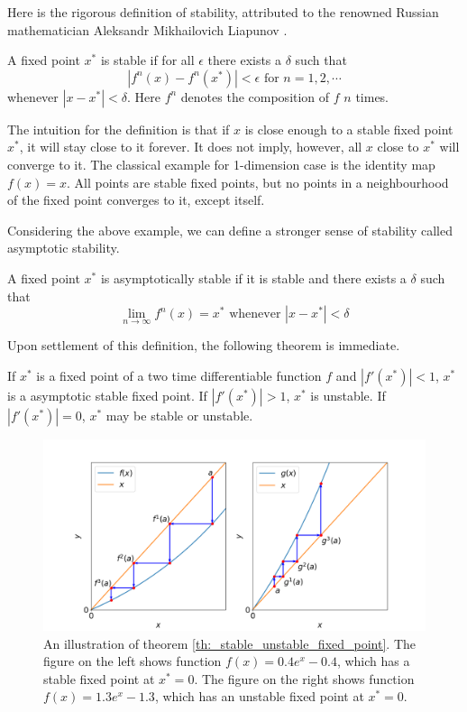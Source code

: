 Here is the rigorous definition of stability, attributed to the renowned Russian mathematician Aleksandr Mikhailovich Liapunov \cite{lyapunov}.

\begin{defn}
A fixed point $x^*$ is stable if for all $\epsilon$ there exists a $\delta$ such that 
$$
	|f^n(x) - f^n(x^*)| < \epsilon \text{ for } n = 1,2, \cdots 
$$
whenever $|x - x^*| < \delta$.
Here $f^n$ denotes the composition of $f$ $n$ times.
\end{defn}

The intuition for the definition is that if $x$ is close enough to a stable fixed point $x^*$, it will stay close to it forever. 
It does not imply, however, all $x$ close to $x^*$ will converge to it.
The classical example for 1-dimension case is the identity map $f(x) = x$. 
All points are stable fixed points, but no points in a neighbourhood of the fixed point converges to it, except itself.

Considering the above example, we can define a stronger sense of stability called asymptotic stability.

\begin{defn}
	A fixed point $x^*$ is asymptotically stable if it is stable and there exists a $\delta$ such that 
	$$
		\lim_{n \rightarrow \infty} f^n(x) = x^* \text{ whenever } |x - x^*| < \delta
	$$
\end{defn}

Upon settlement of this definition, the following theorem is immediate.

\begin{thm}\label{th:_stable_unstable_fixed_point}
	If $x^*$ is a fixed point of a two time differentiable function $f$ and $|f'(x^*)| < 1$, $x^*$ is a  asymptotic stable fixed point.
	If $|f'(x^*)| > 1$, $x^*$ is unstable.
	If $|f'(x^*)| = 0$, $x^*$ may be stable or unstable.
\end{thm}

\begin{figure}
	\centering
	\includegraphics[width=\textwidth]{./figures/stable_and_unstable_fixed_point.png}
	\caption{An illustration of theorem \ref{th:_stable_unstable_fixed_point}.
	The figure on the left shows function $f(x) = 0.4 e^x - 0.4$, which has a stable fixed point at $x^* = 0$. 
	The figure on the right shows function $f(x) = 1.3 e^x - 1.3$, which has an unstable fixed point at $x^* = 0$.}
	\label{fig:stable and unstable fixed point}
\end{figure}

